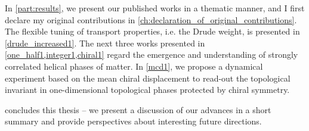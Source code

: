 In \cref{part:results}, we present our published works in a thematic manner, and I first declare my original contributions in \cref{ch:declaration_of_original_contributions}.
The flexible tuning of transport properties, i.e. the Drude weight, is presented in \cref{drude_increased1}.
The next three works presented in \cref{one_half1,integer1,chiral1} regard the emergence and understanding of strongly correlated helical phases of matter.
In \cref{mcd1}, we propose a dynamical experiment based on the mean chiral displacement to read-out the topological invariant in one-dimensional topological phases protected by chiral symmetry.

 concludes this thesis -- we present a discussion of our advances in a short summary and provide perspectives about interesting future directions.
